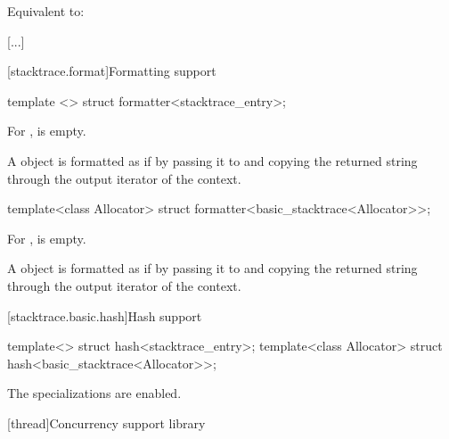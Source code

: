 \documentclass{wg21}
\begin{document}
\begin{itemdescr}
    \pnum
    \effects
    Equivalent to: 
\end{itemdescr}

\textcolor{noteclr}{[...]}

\begin{addedblock}

[stacktrace.format]{Formatting support}

\begin{itemdecl}
template <> struct formatter<stacktrace_entry>;
\end{itemdecl}

\begin{itemdescr}
For ,  is empty.

A  object  is formatted as if by passing it to  and copying the returned string through the output iterator of the context.
\end{itemdescr}



\begin{itemdecl}
template<class Allocator> struct formatter<basic_stacktrace<Allocator>>;
\end{itemdecl}

\begin{itemdescr}
For ,  is empty.

A  object  is formatted as if by passing it to  and copying the returned string through the output iterator of the context.
\end{itemdescr}

\end{addedblock}


[stacktrace.basic.hash]{Hash support}

\begin{itemdecl}
    template<> struct hash<stacktrace_entry>;
    template<class Allocator> struct hash<basic_stacktrace<Allocator>>;
\end{itemdecl}

\begin{itemdescr}
    \pnum
    The specializations are enabled.
\end{itemdescr}

[thread]{Concurrency support library}
\end{document}
